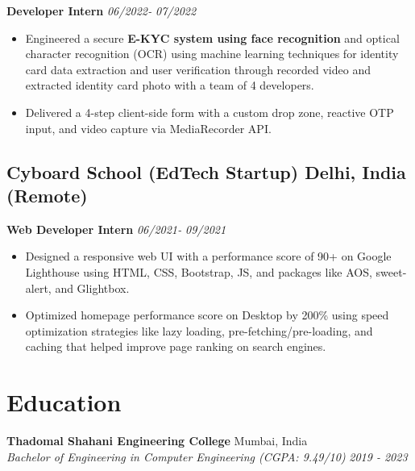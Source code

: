 \documentclass[a4,10pt]{article}
\newenvironment{zitemize}{
\begin{itemize}\itemsep0pt \parskip0pt \parsep1pt}
{\end{itemize}\vspace{-0.5cm}}
\begin{document}
\textbf{Developer Intern} \hfill \textit{06/2022‑ 07/2022} \\
\vspace{-5pt}
\begin{zitemize}
    \item Engineered a secure \textbf{E-KYC system using face recognition} and optical character recognition (OCR) using machine learning techniques for identity card data extraction and user verification through recorded video and extracted identity card photo with a team of 4 developers.
    \item Delivered a 4-step client-side form with a custom drop zone, reactive OTP input, and video capture via MediaRecorder API.
\end{zitemize}


\subsection*{Cyboard School (EdTech Startup) \hfill {\normalsize\normalfont Delhi, India (Remote)}}

\textbf{Web Developer Intern} \hfill \textit{06/2021‑ 09/2021} \\
\vspace{-5pt}
\begin{zitemize}
    \item Designed a responsive web UI with a performance score of 90+ on Google Lighthouse using HTML, CSS, Bootstrap, JS, and packages like AOS, sweet-alert, and Glightbox. 
    \item Optimized homepage performance score on Desktop by 200\% using speed optimization strategies like lazy loading, pre-fetching/pre-loading, and caching that helped improve page ranking on search engines.
\end{zitemize}




\vspace{-5pt}
\section*{Education}

\textbf{Thadomal Shahani Engineering College} \hfill Mumbai, India \\
\textit{Bachelor of Engineering in Computer Engineering (CGPA: 9.49/10)} \hfill \textit{2019 - 2023}
\end{document}
